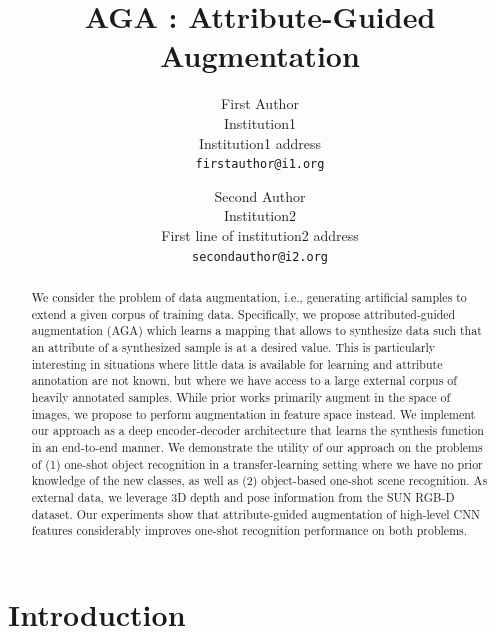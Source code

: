 \documentclass[10pt,twocolumn,letterpaper]{article}
\begin{document}
\title{AGA : Attribute-Guided Augmentation}

\author{First Author\\
Institution1\\
Institution1 address\\
{\tt\small firstauthor@i1.org}
\and
Second Author\\
Institution2\\
First line of institution2 address\\
{\tt\small secondauthor@i2.org}
}

\maketitle

\begin{abstract}
We consider the problem of data augmentation, i.e., generating artificial
samples to extend a given corpus of training data. Specifically, we propose
attributed-guided augmentation (AGA) which learns a mapping
that allows to synthesize data such that an attribute of a synthesized sample 
is at a desired value. This is particularly interesting in situations 
where little data is available for learning and attribute annotation are not known, but where 
we have access to a large external corpus of heavily annotated samples. 
While prior works primarily augment in the space of images,
we propose to perform augmentation in feature space instead.
We implement our approach as a deep encoder-decoder architecture that 
learns the synthesis function in an end-to-end manner. 
We demonstrate the utility of our approach on the problems of (1) 
one-shot object recognition in a transfer-learning setting where
we have no prior knowledge of the new classes, as well as 
(2) object-based one-shot scene recognition.
As external data, we leverage 3D depth and pose information from the 
SUN RGB-D dataset. Our experiments show that attribute-guided augmentation of
high-level CNN features considerably improves one-shot recognition 
performance on both problems.
\end{abstract}

\section{Introduction}
\label{section:introduction}
\end{document}
